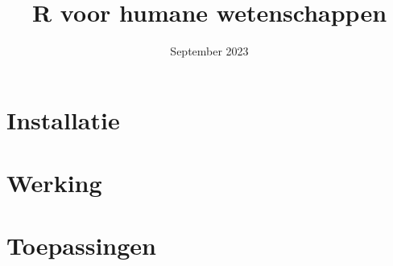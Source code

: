 \documentclass[a4paper,12pt, dutch, oneside ]{book}
\begin{document}
\title{R voor humane wetenschappen}
\date{September 2023}

\maketitle
\tableofcontents

\part{Installatie}

%

\part{Werking}
\part{Toepassingen}
\end{document}
